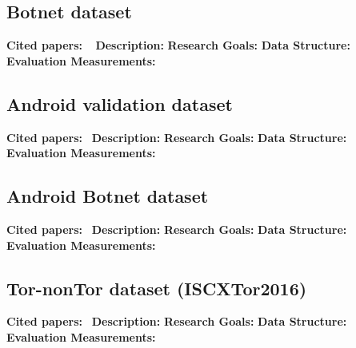 \subsection{Botnet dataset}
\textbf{Cited papers:} ~\cite{beigi2014towards}\newline
\textbf{Description:} \newline
\textbf{Research Goals:}  \newline
\textbf{Data Structure:} \newline
\textbf{Evaluation Measurements:} \newline







\subsection{Android validation dataset}
\textbf{Cited papers:}~\cite{gonzalez2014droidkin} \newline
\textbf{Description:} \newline
\textbf{Research Goals:}  \newline
\textbf{Data Structure:} \newline
\textbf{Evaluation Measurements:} \newline








\subsection{Android Botnet dataset}
\textbf{Cited papers:}~\cite{kadir2015android} \newline
\textbf{Description:} \newline
\textbf{Research Goals:}  \newline
\textbf{Data Structure:} \newline
\textbf{Evaluation Measurements:} \newline






\subsection{Tor-nonTor dataset (ISCXTor2016)}
\textbf{Cited papers:}~\cite{lashkari2017characterization} \newline
\textbf{Description:} \newline
\textbf{Research Goals:}  \newline
\textbf{Data Structure:} \newline
\textbf{Evaluation Measurements:} \newline






